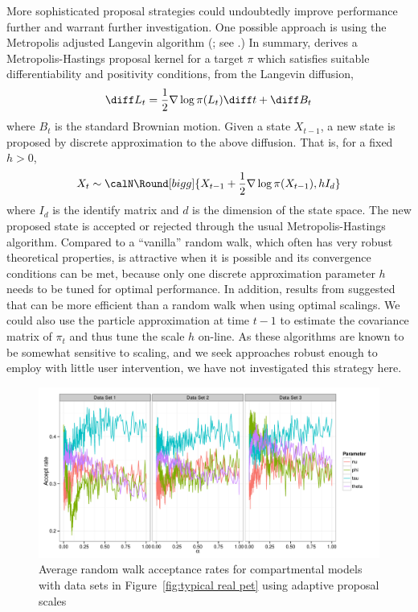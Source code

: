 More sophisticated proposal strategies could undoubtedly improve performance
further and warrant further investigation. One possible approach is using the
Metropolis adjusted Langevin algorithm (\mala; see \cite{Roberts:1996vd}.) In
summary, \mala derives a Metropolis-Hastings proposal kernel for a target
$\pi$ which satisfies suitable differentiability and positivity conditions,
from the Langevin diffusion,
\begin{equation*}
  \diff L_t = \frac{1}{2}\nabla\log\pi(L_t)\diff t + \diff B_t
\end{equation*}
where $B_t$ is the standard Brownian motion. Given a state $X_{t-1}$, a new
state is proposed by discrete approximation to the above diffusion. That is,
for a fixed $h>0$,
\begin{equation}
  X_t\sim\calN\Round[bigg]{X_{t-1}+\frac{1}{2}\nabla\log\pi(X_{t-1}), hI_d}
\end{equation}
where $I_d$ is the identify matrix and $d$ is the dimension of the state
space. The new proposed state is accepted or rejected through the usual
Metropolis-Hastings algorithm. Compared to a ``vanilla'' random walk, which
often has very robust theoretical properties, \mala is attractive when it is
possible and its convergence conditions \cite{Roberts:1996vd} can be met,
because only one discrete approximation parameter $h$ needs to be tuned for
optimal performance. In addition, results from \cite{Roberts:2001ta} suggested
that \mala can be more efficient than a random walk when using optimal
scalings. We could also use the particle approximation at time $t - 1$ to
estimate the covariance matrix of $\pi_t$ and thus tune the scale $h$ on-line.
As these algorithms are known to be somewhat sensitive to scaling, and we seek
approaches robust enough to employ with little user intervention, we have not
investigated this strategy here.

\begin{figure}[t]
  \includegraphics[width=\linewidth]{fig/Adaptive_Proposal}
  \caption{Average random walk acceptance rates for \pet compartmental models
    with data sets in Figure~\ref{fig:typical real pet} using adaptive
    proposal scales}
  \label{fig:pet adaptive proposal}
\end{figure}

